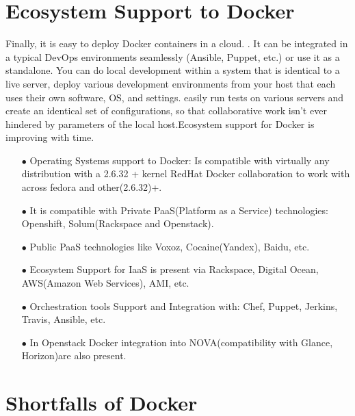 \documentclass[9pt,twocolumn,twoside]{styles/osajnl}
\begin{document}
\section{Ecosystem Support to Docker}
Finally, it is easy to deploy Docker containers in a cloud.
\cite{www-docker-1}. It can be integrated in a typical DevOps
environments seamlessly (Ansible, Puppet, etc.) or use it as a
standalone. You can do local development within a system that is
identical to a live server, deploy various development environments
from your host that each uses their own software, OS, and settings.
easily run tests on various servers and create an identical set of
configurations, so that collaborative work isn’t ever hindered by
parameters of the local host.Ecosystem support for Docker is improving
with time.
\begin{itemize}
\item[$\bullet$]Operating Systems support to Docker: Is compatible
  with virtually any distribution with a 2.6.32 + kernel RedHat Docker
  collaboration to work with across fedora and other(2.6.32)+.

\item[$\bullet$]It is compatible with Private PaaS(Platform as a
  Service) technologies: Openshift, Solum(Rackspace and Openstack).

\item[$\bullet$]Public PaaS technologies like Voxoz,
   Cocaine(Yandex), Baidu, etc.

\item[$\bullet$]Ecosystem Support for IaaS is present via Rackspace,
  Digital Ocean, AWS(Amazon Web Services), AMI, etc.

\item[$\bullet$]Orchestration tools Support and Integration with:
  Chef, Puppet, Jerkins, Travis, Ansible, etc.

\item[$\bullet$]In Openstack Docker integration into
  NOVA(compatibility with Glance, Horizon)are also present.
\end{itemize}
\section{Shortfalls of Docker}
\end{document}
